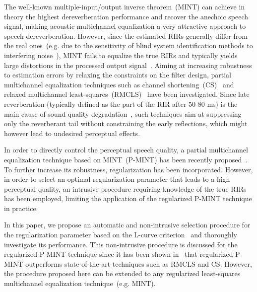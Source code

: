 \documentclass{article}
\begin{document}
The well-known multiple-input/output inverse theorem~(MINT) \cite{Miyoshi_ITASS_1988} can achieve in theory the highest dereverberation performance and recover the anechoic speech signal, making acoustic multichannel equalization a very attractive approach to speech dereverberation.
However, since the estimated RIRs generally differ from the real ones~(e.g. due to the sensitivity of blind system identification methods to interfering noise~\cite{Hasan_EUSIPCO_2006}), MINT fails to equalize the true RIRs and typically yields large distortions in the processed output signal~\cite{Radlovic_ITSA_2000}.
Aiming at increasing robustness to estimation errors by relaxing the constraints on the filter design, partial multichannel equalization techniques such as channel shortening~(CS)~\cite{Kallinger_ICASSP_2006} and relaxed multichannel least-squares~(RMCLS)~\cite{Zhang_IWAENC_2010} have been investigated. 
Since late reverberation (typically defined as the part of the RIR after $50$-$80$ ms) is the main cause of sound quality degradation~\cite{}, such techniques aim at suppressing only the reverberant tail without constraining the early reflections, which might however lead to undesired perceptual effects.

In order to directly control the perceptual speech quality, a partial multichannel equalization technique based on MINT~(P-MINT) has been recently proposed~\cite{Kodrasi_ICASSP_2012}.
To further increase its robustness, regularization has been incorporated.
However, in order to select an optimal regularization parameter that leads to a high perceptual quality, an intrusive procedure requiring knowledge of the true RIRs has been employed, limiting the application of the regularized P-MINT technique in practice.

In this paper, we propose an automatic and non-intrusive selection procedure for the regularization parameter based on the L-curve criterion~\cite{Hansen_1993} and thoroughly investigate its performance.
This non-intrusive procedure is discussed for the regularized P-MINT technique since it has been shown in~\cite{Kodrasi_ICASSP_2012} that regularized P-MINT outperforms state-of-the-art techniques such as RMCLS and CS.
However, the procedure proposed here can be extended to any regularized least-squares multichannel equalization technique~(e.g. MINT).
\end{document}
